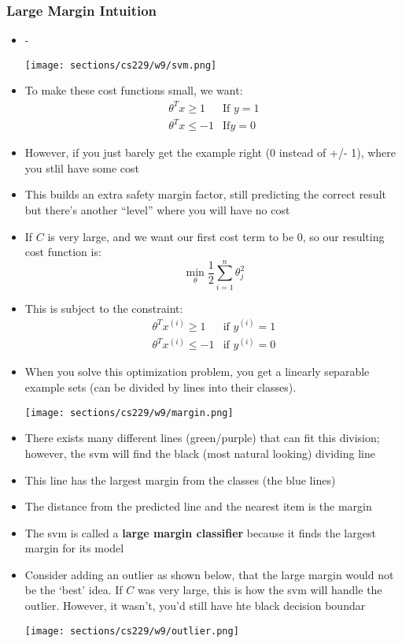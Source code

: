 \subsubsection{Large Margin Intuition}
\begin{itemize}[--]
	\item -
	\begin{center}
		\texttt{[image: sections/cs229/w9/svm.png]}
	\end{center}

	\item To make these cost functions small, we want:
	\begin{align*}
		\theta^{T}x\geq 1 &\text{If } y=1 \\
		\theta^{T}x\leq -1 &\text{If} y=0
	\end{align*}

	\item However, if you just barely get the example right (0 instead of +/- 1), where you stlil have some cost
	\item This builds an extra safety margin factor, still predicting the correct result but there's another ``level'' where you will have no cost
	\item If $C$ is very large, and we want our first cost term to be 0, so our resulting cost function is:
		$$\min_{\theta}\frac{1}{2}\sum_{i=1}^{n}\theta_{j}^{2}$$
	\item This is subject to the constraint: 
	\begin{align*}
		\theta^{T}x^{(i)}\geq 1  & \text{if } y^{(i)}=1\\
		\theta^{T}x^{(i)}\leq -1 & \text{if } y^{(i)}=0
	\end{align*}

	\item When you solve this optimization problem, you get a linearly separable example sets (can be divided by lines into their classes).
	\begin{center}
		\texttt{[image: sections/cs229/w9/margin.png]}
	\end{center}

	\item There exists many different lines (green/purple) that can fit this division; however, the svm will find the black (most natural looking) dividing line
	\item This line has the largest margin from the classes (the blue lines)
	\item The distance from the predicted line and the nearest item is the margin
	\item The svm is called a \textbf{large margin classifier} because it finds the largest margin for its model
	\item Consider adding an outlier as shown below, that the large margin would not be the `best' idea. If $C$ was very large, this is how the svm will handle the outlier. However, it wasn't, you'd still have hte black decision boundar
	\begin{center}
		\texttt{[image: sections/cs229/w9/outlier.png]}
	\end{center}
\end{itemize}

